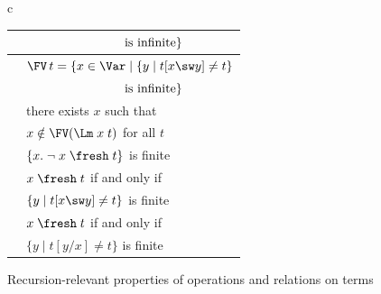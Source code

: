 \begin{figure}
{\begin{tabular}{c}
\begin{tabular}{|c|l|}
	\\& 
	$\hspace*{17.2ex}\mbox{ is infinite} \}
	$
	\\\hline 
    \textrm{\FvDSw}  &
    $\FV\,t = \{x\in \Var \mid \{y \mid t[x \sw y] \not= t\}$ 
    \\& 
    $\hspace*{17.2ex}\mbox{ is infinite} \}$
	\\\hline 
	\textrm{\FCB}  &	
	there exists $x$ such that
	\\&
	$x \notin \FV(\Lm\;x\;t)$ for all $t$ 
	\\\hline 
	\textrm{\FSupFr}  	&   
	$\{x.\;\neg\;x \;\fresh\;t\}$ is finite
	\\\hline 
		\textrm{\FrDSw}  &
	$x\;\fresh\;t $ if and only if 
	\\& $\{y \mid t[x \sw y] \not= t\}$ is finite 
	\\\hline 
	\textrm{\FrDRn}  &
	$x\;\fresh\;t $ if and only if 
	\\& $\{y \mid t[y / x] \not= t\}$ is finite 
    \\\hline
\end{tabular}
\end{tabular} 
} %
\vspace*{-0.3ex}
\caption{Recursion-relevant properties of operations and relations on terms}
\label{fig-basicProps}
\vspace*{-4ex}
\end{figure} 


